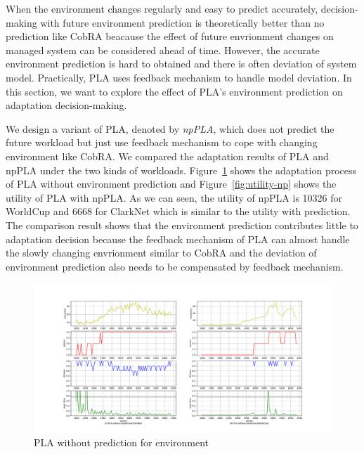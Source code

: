 \documentclass[sigconf]{acmart}
\begin{document}
When the environment changes regularly and easy to predict accurately, decision-making with future environment prediction is theoretically better than no prediction like CobRA beacause the effect of future envrionment changes on managed system can be considered ahead of time. However, the accurate environment prediction is hard to obtained and there is often deviation of system model. Practically, PLA uses feedback mechanism to handle model deviation. In this section, we want to explore the effect of PLA's environment prediction on adaptation decision-making. 

We design a variant of PLA, denoted by \textit{npPLA}, which does not predict the future workload but just use feedback mechanism to cope with changing environment like CobRA. We compared the adaptation results of PLA and npPLA under the two kinds of workloads. Figure~\ref{fig:nopre} shows the adaptation process of PLA without environment prediction and Figure~\ref{fig:utility-np} shows the utility of PLA with npPLA. As we can seen, the utility of npPLA is 10326 for WorldCup and 6668 for ClarkNet which is similar to the utility with prediction. The comparison result shows that the environment prediction contributes little to adaptation decision because  the feedback mechanism of PLA can almost handle the slowly changing envrionment similar to CobRA and the deviation of environment prediction also needs to be compensated by feedback mechanism. 

\begin{figure}[!htp]
	\centering
	\includegraphics[width=\linewidth]{nopre}
	\caption{PLA without prediction for environment}
	\label{fig:nopre}
\end{figure}
\end{document}
